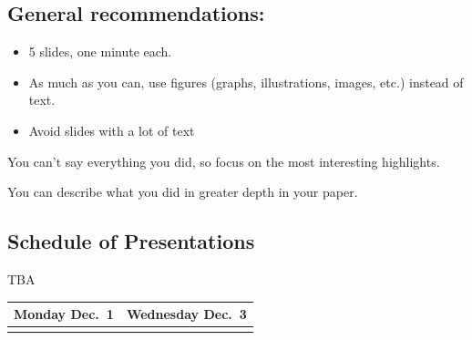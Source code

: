 \documentclass[
]{article}
\providecommand{\tightlist}{%
  \setlength{\itemsep}{0pt}\setlength{\parskip}{0pt}}
\begin{document}
\subsection{General recommendations:}\label{general-recommendations-1}

\begin{itemize}
\tightlist
\item
  5 slides, one minute each.
\item
  As much as you can, use figures (graphs, illustrations, images, etc.)
  instead of text.
\item
  Avoid slides with a lot of text
\end{itemize}

You can't say everything you did, so focus on the most interesting
highlights.

You can describe what you did in greater depth in your paper.

\subsection{Schedule of
Presentations}\label{schedule-of-presentations-1}

TBA

\begin{longtable}[]{@{}cc@{}}
\toprule\noalign{}
Monday Dec.~1 & Wednesday Dec.~3 \\
\midrule\noalign{}
\endhead
\bottomrule\noalign{}
\endlastfoot
& \\
\end{longtable}
\end{document}
